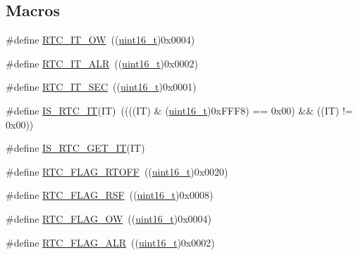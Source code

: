 \subsection*{Macros}
\begin{DoxyCompactItemize}
\item 
\#define \hyperlink{group___r_t_c__interrupts__define_gabcfefb2f22cb8ca65113c2c13d0e0640}{R\+T\+C\+\_\+\+I\+T\+\_\+\+OW}~((\hyperlink{_p_e___types_8h_a1f1825b69244eb3ad2c7165ddc99c956}{uint16\+\_\+t})0x0004)
\item 
\#define \hyperlink{group___r_t_c__interrupts__define_ga92f0316a3c69aefc2b20c3392843d3da}{R\+T\+C\+\_\+\+I\+T\+\_\+\+A\+LR}~((\hyperlink{_p_e___types_8h_a1f1825b69244eb3ad2c7165ddc99c956}{uint16\+\_\+t})0x0002)
\item 
\#define \hyperlink{group___r_t_c__interrupts__define_ga960bccbc10da872549cf52c03dd342f1}{R\+T\+C\+\_\+\+I\+T\+\_\+\+S\+EC}~((\hyperlink{_p_e___types_8h_a1f1825b69244eb3ad2c7165ddc99c956}{uint16\+\_\+t})0x0001)
\item 
\#define \hyperlink{group___r_t_c__interrupts__define_ga5c941995b804ce4c7ef62e28e0133a83}{I\+S\+\_\+\+R\+T\+C\+\_\+\+IT}(IT)~((((IT) \& (\hyperlink{_p_e___types_8h_a1f1825b69244eb3ad2c7165ddc99c956}{uint16\+\_\+t})0x\+F\+F\+F8) == 0x00) \&\& ((\+I\+T) != 0x00))
\item 
\#define \hyperlink{group___r_t_c__interrupts__define_ga2e10d8ccb2aa398ac14bde526f98dbc9}{I\+S\+\_\+\+R\+T\+C\+\_\+\+G\+E\+T\+\_\+\+IT}(IT)
\item 
\#define \hyperlink{group___r_t_c__interrupts__flags_ga203dcbb991497e4d0e6722815f6db942}{R\+T\+C\+\_\+\+F\+L\+A\+G\+\_\+\+R\+T\+O\+FF}~((\hyperlink{_p_e___types_8h_a1f1825b69244eb3ad2c7165ddc99c956}{uint16\+\_\+t})0x0020)
\item 
\#define \hyperlink{group___r_t_c__interrupts__flags_ga78c4245996bef8d5f39226b6e37ed9c0}{R\+T\+C\+\_\+\+F\+L\+A\+G\+\_\+\+R\+SF}~((\hyperlink{_p_e___types_8h_a1f1825b69244eb3ad2c7165ddc99c956}{uint16\+\_\+t})0x0008)
\item 
\#define \hyperlink{group___r_t_c__interrupts__flags_ga4e321e359b914d7ed10eed985f8b4811}{R\+T\+C\+\_\+\+F\+L\+A\+G\+\_\+\+OW}~((\hyperlink{_p_e___types_8h_a1f1825b69244eb3ad2c7165ddc99c956}{uint16\+\_\+t})0x0004)
\item 
\#define \hyperlink{group___r_t_c__interrupts__flags_gaed4375a7ea5a147f83c6cf4bfa805caf}{R\+T\+C\+\_\+\+F\+L\+A\+G\+\_\+\+A\+LR}~((\hyperlink{_p_e___types_8h_a1f1825b69244eb3ad2c7165ddc99c956}{uint16\+\_\+t})0x0002)
\item 

\end{DoxyCompactItemize}

